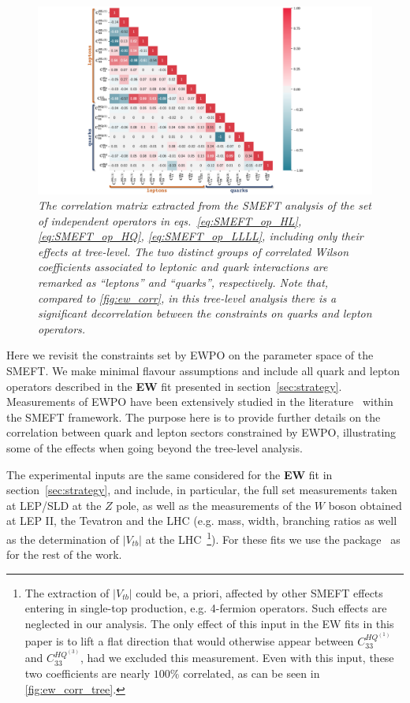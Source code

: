 \begin{figure}[t]
	\centering
	\includegraphics[width=\textwidth]{figures/heatmap_EW.pdf}
	\caption{\it The correlation matrix extracted from the SMEFT analysis of the set of independent operators in eqs.~\eqref{eq:SMEFT_op_HL}, \eqref{eq:SMEFT_op_HQ}, \eqref{eq:SMEFT_op_LLLL}, including only their effects at tree-level. The two distinct groups of correlated Wilson coefficients associated to leptonic and quark interactions are remarked as ``leptons'' and ``quarks'', respectively. Note that, compared to \autoref{fig:ew_corr}, in this tree-level analysis there is a significant decorrelation between the constraints on quarks and lepton operators.
	}
	\label{fig:ew_corr_tree}
\end{figure}

Here we revisit the constraints set by EWPO on the parameter space of the SMEFT. We make minimal flavour assumptions and include all quark and lepton operators described in the {\bf EW} fit presented in section~\ref{sec:strategy}. Measurements of EWPO have been extensively studied in the literature~\cite{Han:2004az,delAguila:2011zs,Ciuchini:2013pca,deBlas:2013gla,Falkowski:2014tna,Berthier:2015oma,Efrati:2015eaa,deBlas:2016nqo,deBlas:2017wmn,Ellis:2018gqa,Dawson:2019clf} within the SMEFT framework. The purpose here is to provide further details on the correlation between quark and lepton sectors constrained by EWPO, illustrating some of the effects when going beyond the tree-level analysis. 

The experimental inputs are the same considered for the {\bf EW} fit in section~\ref{sec:strategy}, and include, in particular, the full set measurements taken at LEP/SLD at the $Z$ pole, as well as the measurements of the $W$ boson obtained at LEP II, the Tevatron and the LHC (e.g. mass, width, branching ratios as well as the determination of $\left|V_{tb}\right|$ at the LHC~\footnote{The extraction of $\left|V_{tb}\right|$ could be, a priori, affected by other SMEFT effects entering in single-top production, e.g. 4-fermion operators. Such effects are neglected in our  analysis. The only effect of this input in the EW fits in this paper is to lift a flat direction that would otherwise appear between $C^{HQ^{(1)}}_{33}$ and $C^{HQ^{(3)}}_{33}$, had we excluded this measurement. Even with this input, these two coefficients are nearly $100\%$ correlated, as can be seen in \autoref{fig:ew_corr_tree}.}). For these fits we use the \HEPfit package~\cite{deBlas:2019okz} as for the rest of the work. 

